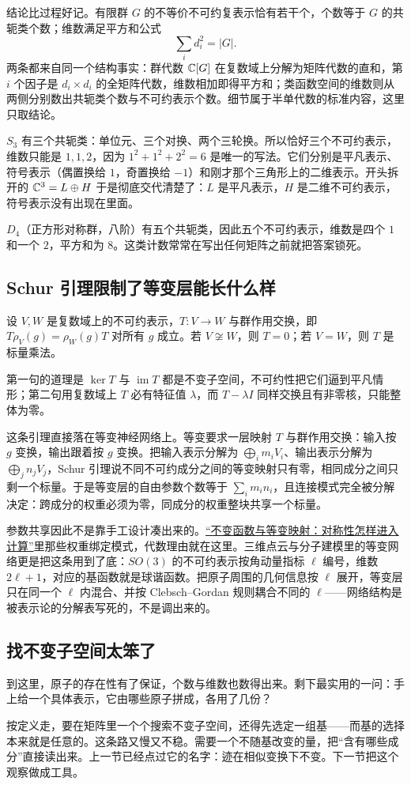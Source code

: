 结论比过程好记。有限群 \(G\) 的不等价不可约复表示恰有若干个，个数等于 \(G\) 的共轭类个数；维数满足平方和公式
\[
\sum_i d_i^2=|G|.
\]
两条都来自同一个结构事实：群代数 \(\mathbb{C}[G]\) 在复数域上分解为矩阵代数的直和，第 \(i\) 个因子是 \(d_i\times d_i\) 的全矩阵代数，维数相加即得平方和；类函数空间的维数则从两侧分别数出共轭类个数与不可约表示个数。细节属于半单代数的标准内容，这里只取结论。

\(S_3\) 有三个共轭类：单位元、三个对换、两个三轮换。所以恰好三个不可约表示，维数只能是 \(1,1,2\)，因为 \(1^2+1^2+2^2=6\) 是唯一的写法。它们分别是平凡表示、符号表示（偶置换给 \(1\)，奇置换给 \(-1\)）和刚才那个三角形上的二维表示。开头拆开的 \(\mathbb{C}^3=L\oplus H\) 于是彻底交代清楚了：\(L\) 是平凡表示，\(H\) 是二维不可约表示，符号表示没有出现在里面。

\(D_4\)（正方形对称群，八阶）有五个共轭类，因此五个不可约表示，维数是四个 \(1\) 和一个 \(2\)，平方和为 \(8\)。这类计数常常在写出任何矩阵之前就把答案锁死。

\subsection{Schur 引理限制了等变层能长什么样}

\begin{lemma}[Schur]
设 \(V,W\) 是复数域上的不可约表示，\(T:V\to W\) 与群作用交换，即 \(T\rho_V(g)=\rho_W(g)T\) 对所有 \(g\) 成立。若 \(V\not\cong W\)，则 \(T=0\)；若 \(V=W\)，则 \(T\) 是标量乘法。
\end{lemma}

第一句的道理是 \(\ker T\) 与 \(\operatorname{im}T\) 都是不变子空间，不可约性把它们逼到平凡情形；第二句用复数域上 \(T\) 必有特征值 \(\lambda\)，而 \(T-\lambda I\) 同样交换且有非零核，只能整体为零。

这条引理直接落在等变神经网络上。等变要求一层映射 \(T\) 与群作用交换：输入按 \(g\) 变换，输出跟着按 \(g\) 变换。把输入表示分解为 \(\bigoplus_i m_iV_i\)、输出表示分解为 \(\bigoplus_j n_jV_j\)，Schur 引理说不同不可约成分之间的等变映射只有零，相同成分之间只剩一个标量。于是等变层的自由参数个数等于 \(\sum_i m_in_i\)，且连接模式完全被分解决定：跨成分的权重必须为零，同成分的权重整块共享一个标量。

参数共享因此不是靠手工设计凑出来的。\hyperref[sec:04-Discrete-Mathematics/06-Groups-and-Symmetry/04]{``不变函数与等变映射：对称性怎样进入计算''}里那些权重绑定模式，代数理由就在这里。三维点云与分子建模里的等变网络更是把这条用到了底：\(SO(3)\) 的不可约表示按角动量指标 \(\ell\) 编号，维数 \(2\ell+1\)，对应的基函数就是球谐函数。把原子周围的几何信息按 \(\ell\) 展开，等变层只在同一个 \(\ell\) 内混合、并按 Clebsch--Gordan 规则耦合不同的 \(\ell\)——网络结构是被表示论的分解表写死的，不是调出来的。

\subsection{找不变子空间太笨了}

到这里，原子的存在性有了保证，个数与维数也数得出来。剩下最实用的一问：手上给一个具体表示，它由哪些原子拼成，各用了几份？

按定义走，要在矩阵里一个个搜索不变子空间，还得先选定一组基——而基的选择本来就是任意的。这条路又慢又不稳。需要一个不随基改变的量，把``含有哪些成分''直接读出来。上一节已经点过它的名字：迹在相似变换下不变。下一节把这个观察做成工具。
